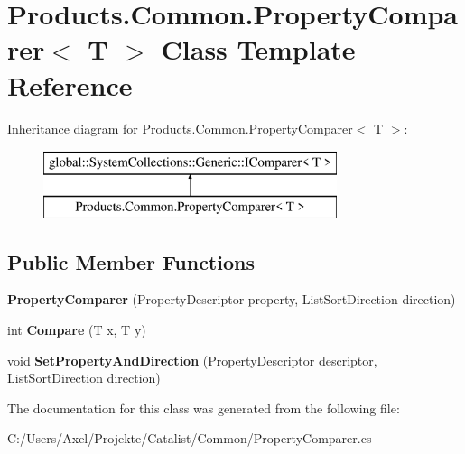 \hypertarget{class_products_1_1_common_1_1_property_comparer}{}\section{Products.\+Common.\+Property\+Comparer$<$ T $>$ Class Template Reference}
\label{class_products_1_1_common_1_1_property_comparer}
Inheritance diagram for Products.\+Common.\+Property\+Comparer$<$ T $>$\+:\begin{figure}[H]
\begin{center}
\leavevmode
\includegraphics[height=2.000000cm]{class_products_1_1_common_1_1_property_comparer}
\end{center}
\end{figure}
\subsection*{Public Member Functions}
\begin{DoxyCompactItemize}
\item 
{\bfseries Property\+Comparer} (Property\+Descriptor property, List\+Sort\+Direction direction)\hypertarget{class_products_1_1_common_1_1_property_comparer_a3f5e5c0420aea1058b8faf61b47d6a2d}{}\label{class_products_1_1_common_1_1_property_comparer_a3f5e5c0420aea1058b8faf61b47d6a2d}

\item 
int {\bfseries Compare} (T x, T y)\hypertarget{class_products_1_1_common_1_1_property_comparer_a719ad2a02769358dd3187296e52be6fd}{}\label{class_products_1_1_common_1_1_property_comparer_a719ad2a02769358dd3187296e52be6fd}

\item 
void {\bfseries Set\+Property\+And\+Direction} (Property\+Descriptor descriptor, List\+Sort\+Direction direction)\hypertarget{class_products_1_1_common_1_1_property_comparer_a2da06a93f93203d2be2cfc7cbb4129bb}{}\label{class_products_1_1_common_1_1_property_comparer_a2da06a93f93203d2be2cfc7cbb4129bb}

\end{DoxyCompactItemize}


The documentation for this class was generated from the following file\+:\begin{DoxyCompactItemize}
\item 
C\+:/\+Users/\+Axel/\+Projekte/\+Catalist/\+Common/Property\+Comparer.\+cs\end{DoxyCompactItemize}
